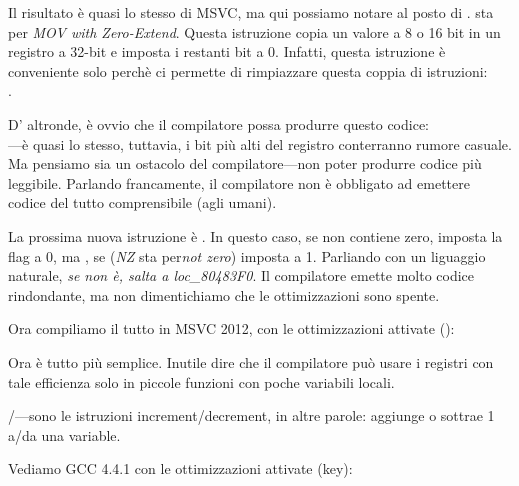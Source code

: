 \label{movzx}

Il risultato è quasi lo stesso di MSVC, ma qui possiamo notare \MOVZX al posto di \MOVSX. 
\MOVZX sta per \emph{MOV with Zero-Extend}. 
Questa istruzione copia un valore a 8 o 16 bit in un registro a 32-bit e imposta i restanti bit a 0. 
Infatti, questa istruzione è conveniente solo perchè ci permette di rimpiazzare questa coppia di istruzioni:\\
.

D' altronde, è ovvio che il compilatore possa produrre questo codice:\\
---è quasi lo stesso, tuttavia, 
i bit più alti del registro \EAX conterranno rumore casuale. 
Ma pensiamo sia un ostacolo del compilatore---non poter produrre codice più leggibile. 
Parlando francamente, il compilatore non è obbligato ad emettere codice del tutto comprensibile (agli umani).


La prossima nuova istruzione è \SETNZ. 
In questo caso, se \AL non contiene zero,  
imposta la flag \ZF a 0, ma \SETNZ, se  (\emph{NZ} sta per\emph{not zero}) imposta \AL a 1.
Parliando con un liguaggio naturale, \emph{se \AL non è, salta a loc\_80483F0}. 
Il compilatore emette molto codice rindondante, ma non dimentichiamo che le ottimizzazioni sono spente.

\label{strlen_MSVC_Ox}

Ora compiliamo il tutto in MSVC 2012, con le ottimizzazioni attivate (\Ox):



Ora è tutto più semplice.
Inutile dire che il compilatore può usare i registri con tale efficienza 
solo in piccole funzioni con poche variabili locali.

\INC/\DEC---sono le istruzioni \gls{increment}/\gls{decrement}, in altre parole: aggiunge o sottrae 1 a/da una variable.




Vediamo GCC 4.4.1 con le ottimizzazioni attivate (\Othree key):


 
